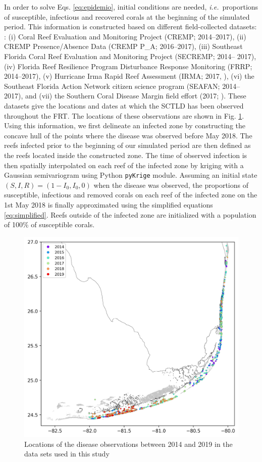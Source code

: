 \documentclass[utf8]{frontiersSCNS}
\newcommand{\ie}{{\it i.e.}\ }
\begin{document}
In order to solve Eqs. \ref{eq:epidemio}, initial conditions are needed, \ie proportions of susceptible, infectious and recovered corals at the beginning of the simulated period. This information is constructed based on different field-collected datasets: : (i) Coral Reef Evaluation and Monitoring Project (CREMP; 2014–2017), (ii) CREMP Presence/Absence Data (CREMP P\_A; 2016–2017), (iii) Southeast Florida Coral Reef Evaluation and Monitoring Project (SECREMP; 2014– 2017), (iv) Florida Reef Resilience Program Disturbance Response Monitoring (FRRP; 2014–2017), (v) Hurricane Irma Rapid Reef Assessment (IRMA; 2017, \cite{viehman2018}), (vi) the Southeast Florida Action Network citizen science program (SEAFAN; 2014–2017), and (vii) the Southern Coral Disease Margin field effort (2017; \cite{neely2018surveying}). These datasets give the locations and dates at which the SCTLD has been observed throughout the FRT. The locations of these observations are shown in Fig. \ref{fig:stns}. Using this information, we first delineate an infected zone by constructing the concave hull of the points where the disease was observed before May 2018. The reefs infected prior to the beginning of our simulated period are then defined as the reefs located inside the constructed zone. The time of observed infection is then spatially interpolated on each reef of the infected zone by kriging with a Gaussian semivariogram using Python \texttt{pyKrige} module. Assuming an initial state $(S,I,R)=(1-I_0, I_0, 0)$ when the disease was observed, the proportions of susceptible, infectious and removed corals on each reef of the infected zone on the 1st May 2018 is finally approximated using the simplified equations \ref{eq:simplified}. Reefs outside of the infected zone are initialized with a population of 100\% of susceptible corals.  

\begin{figure}
    \center
    \includegraphics[width=.6\textwidth]{figures/monitoring.png}
    \caption{Locations of the disease observations between 2014 and 2019 in the data sets used in this study}
    \label{fig:stns}
\end{figure}
\end{document}
